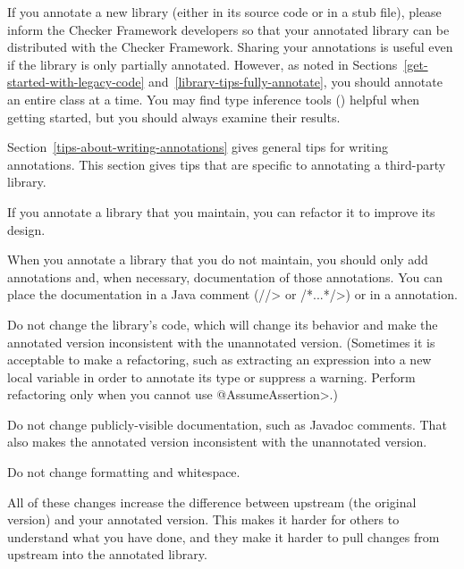 If you annotate a new library (either in its source code or in a stub
file), please inform the Checker Framework
developers so that your annotated library can be distributed with the
Checker Framework.
Sharing your annotations is useful even if the library is only partially
annotated.
However, as noted in Sections~\ref{get-started-with-legacy-code} and~\ref{library-tips-fully-annotate}, you
should annotate an entire class at a time.
You may find type inference tools () helpful
when getting started, but you should always examine their results.



Section~\ref{tips-about-writing-annotations} gives general tips for writing
annotations.  This section gives tips that are specific to annotating a
third-party library.



If you annotate a library that you maintain, you can refactor it to improve
its design.

When you annotate a library that you do not maintain, you should only add
annotations and, when necessary, documentation of those annotations.  You
can place the documentation in a Java comment (\<//> or \</*...*/>) or in a
 annotation.

Do not change the library's code, which will change its behavior and make
the annotated version inconsistent with the unannotated version.
(Sometimes it is acceptable to make a refactoring, such as extracting an
expression into a new local variable in order to annotate its type or
suppress a warning.  Perform refactoring only when you cannot use
\<@AssumeAssertion>.)

Do not change publicly-visible documentation, such as Javadoc comments.
That also makes the annotated version inconsistent with the unannotated
version.

Do not change formatting and whitespace.

All of these changes increase the difference between upstream (the original
version) and your annotated version.  This makes it harder for others to
understand what you have done, and they make it harder to pull changes from
upstream into the annotated library.


